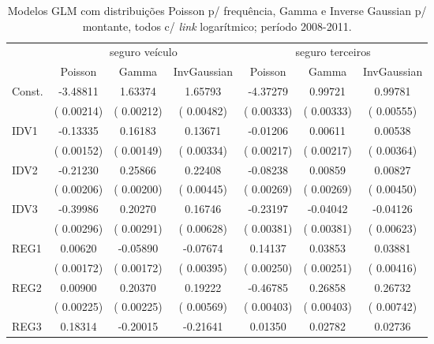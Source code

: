 {\scriptsize
\begin{center}
\begin{table}
    \begin{threeparttable}
        \caption{\small{Modelos GLM com distribuições Poisson p/ frequência, Gamma e Inverse Gaussian p/ montante, todos c/ \textit{link} logarítmico; período 2008-2011.}}
        \begin{tabular}{lcccccc} \toprule
        & \multicolumn{3}{c}{seguro veículo} & \multicolumn{3}{c}{seguro terceiros} \\
        \cmidrule(l{.75em}){2-4} \cmidrule(l{.75em}){5-7}
        & Poisson & Gamma & InvGaussian & Poisson & Gamma & InvGaussian \\ \midrule
        Const. & -3.48811 &  1.63374 &  1.65793 & -4.37279 &  0.99721 &  0.99781 \\
        & \tiny{( 0.00214)} & \tiny{( 0.00212)} & \tiny{( 0.00482)} & \tiny{( 0.00333)} & \tiny{( 0.00333)} & \tiny{( 0.00555)} \\
        IDV1 & -0.13335 &  0.16183 &  0.13671 & -0.01206 &  0.00611 &  0.00538 \\
        & \tiny{( 0.00152)} & \tiny{( 0.00149)} & \tiny{( 0.00334)} & \tiny{( 0.00217)} & \tiny{( 0.00217)} & \tiny{( 0.00364)} \\
        IDV2 & -0.21230 &  0.25866 &  0.22408 & -0.08238 &  0.00859 &  0.00827 \\
        & \tiny{( 0.00206)} & \tiny{( 0.00200)} & \tiny{( 0.00445)} & \tiny{( 0.00269)} & \tiny{( 0.00269)} & \tiny{( 0.00450)} \\
        IDV3 & -0.39986 &  0.20270 &  0.16746 & -0.23197 & -0.04042 & -0.04126 \\
        & \tiny{( 0.00296)} & \tiny{( 0.00291)} & \tiny{( 0.00628)} & \tiny{( 0.00381)} & \tiny{( 0.00381)} & \tiny{( 0.00623)} \\
        REG1 &  0.00620 & -0.05890 & -0.07674 &  0.14137 &  0.03853 &  0.03881 \\
        & \tiny{( 0.00172)} & \tiny{( 0.00172)} & \tiny{( 0.00395)} & \tiny{( 0.00250)} & \tiny{( 0.00251)} & \tiny{( 0.00416)} \\
        REG2 &  0.00900 &  0.20370 &  0.19222 & -0.46785 &  0.26858 &  0.26732 \\
        & \tiny{( 0.00225)} & \tiny{( 0.00225)} & \tiny{( 0.00569)} & \tiny{( 0.00403)} & \tiny{( 0.00403)} & \tiny{( 0.00742)} \\
        REG3 &  0.18314 & -0.20015 & -0.21641 &  0.01350 &  0.02782 &  0.02736 \\

\end{tabular}
\end{threeparttable}
\end{table}
\end{center}}
